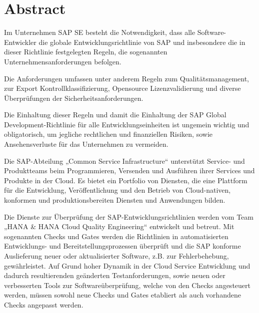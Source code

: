\documentclass[
	12pt, %
	a4paper,
	liststotoc, %
	bibtotoc, %
	pointlessnumbers, %
	ngerman, %
	headsepline, %
	oneside %
	]{scrbook} %
\begin{document}
\onehalfspacing %


\chapter*{Abstract}

Im Unternehmen SAP SE besteht die Notwendigkeit, dass alle Software-Entwickler die globale Entwicklungsrichtlinie von SAP und insbesondere die in dieser Richtlinie festgelegten Regeln, die sogenannten Unternehmensanforderungen befolgen.

Die Anforderungen umfassen unter anderem Regeln zum Qualitätsmanagement, zur Export Kontrollklassifizierung, Opensource Lizenzvalidierung und diverse Überprüfungen der Sicherheitsanforderungen.

Die Einhaltung dieser Regeln und damit die Einhaltung der SAP Global Development-Richtlinie für alle Entwicklungseinheiten ist ungemein wichtig und obligatorisch, um jegliche rechtlichen und finanziellen Risiken, sowie Ansehensverluste für das Unternehmen zu vermeiden.

Die SAP-Abteilung „Common Service Infrastructure“ unterstützt Service- und Produktteams beim Programmieren, Versenden und Ausführen ihrer Services und Produkte in der Cloud.
 Es bietet ein Portfolio von Diensten, die eine Plattform für die Entwicklung, Veröffentlichung und den Betrieb von Cloud-nativen, konformen und produktionsbereiten Diensten und Anwendungen bilden.

Die Dienste zur Überprüfung der SAP-Entwicklungsrichtlinien werden vom Team „HANA \& HANA Cloud Quality Engineering“ entwickelt und betreut.
Mit sogenannten Checks und Gates werden die Richtlinien in automatisierten Entwicklungs- und Bereitstellungsprozessen überprüft und die SAP konforme Auslieferung neuer oder aktualisierter Software, z.B. zur Fehlerbehebung, gewährleistet.
 Auf Grund hoher Dynamik in der Cloud Service Entwicklung und dadurch resultierenden geänderten Testanforderungen, sowie neuen oder verbesserten Tools zur Softwareüberprüfung, welche von den Checks angesteuert werden, müssen sowohl neue Checks und Gates etabliert als auch vorhandene Checks angepasst werden.
\end{document}
